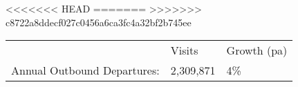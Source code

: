 <<<<<<< HEAD
=======
>>>>>>> c8722a8ddecf027c0456a6ca3fc4a32bf2b745ee
\begin{tabular}[t]{p{4.8cm}>{\hfill}p{1.3cm}>{\hfill}p{1.4cm}}
   & Visits & Growth (pa) \\ 
 Annual Outbound Departures: & 2,309,871 & 4\% \\ 
  \end{tabular}
